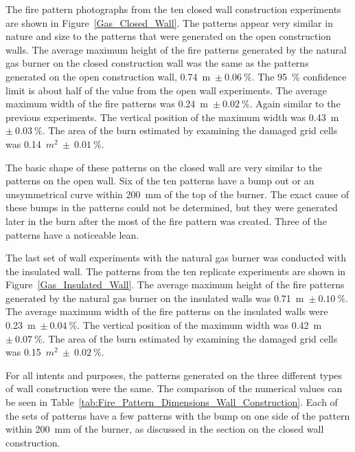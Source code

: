 \documentclass[twoside]{uocthesis}
\begin{document}
{The fire pattern photographs from the ten closed wall construction experiments are shown in Figure~\ref{Gas_Closed_Wall}. 
The patterns appear very similar in nature and size to the patterns that were generated on the open construction walls.  The average maximum height of the fire patterns generated by the natural gas burner on the closed construction wall was the same as the patterns generated on the open construction wall, 0.74~m~$\pm~0.06~\%$.  The 95~$\%$ confidence limit is about half of the value from the open wall experiments. The average maximum width of the fire patterns was 0.24~m~$\pm~0.02~\%$.  Again similar to the previous experiments. The vertical position of the maximum width was 0.43~m~$\pm~0.03~\%$. The area of the burn estimated by examining the damaged grid cells was 0.14~$m^2~\pm~0.01~\%$.  

The basic shape of these patterns on the closed wall are very similar to the patterns on the open wall.  Six of the ten patterns have a bump out or an unsymmetrical curve within 200~mm of the top of the burner.  The exact cause of these bumps in the patterns could not be determined, but they were generated later in the burn after the most of the fire pattern was created. Three of the patterns have a noticeable lean.     

The last set of wall experiments with the natural gas burner was conducted with the insulated wall.  The patterns from the ten replicate experiments are shown in Figure~\ref{Gas_Insulated_Wall}.  The average maximum height of the fire patterns generated by the natural gas burner on the insulated walls was 0.71~m~$\pm~0.10~\%$.  The average maximum width of the fire patterns on the insulated walls were 0.23~m~$\pm~0.04~\%$.  The vertical position of the maximum width was 0.42~m~$\pm~0.07~\%$. The area of the burn estimated by examining the damaged grid cells was 0.15~$m^2~\pm~0.02~\%$.  

For all intents and purposes, the patterns generated on the three different types of wall construction were the same.  The comparison of the numerical values can be seen in Table~\ref{tab:Fire_Pattern_Dimensions_Wall_Construction}.  Each of the sets of patterns have a few patterns with the bump on one side of the pattern within 200~mm of the burner, as discussed in the section on the closed wall construction. 

}
\end{document}
